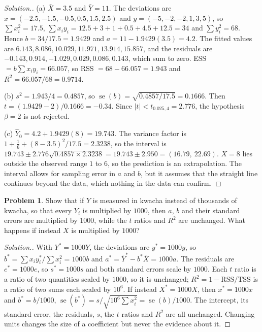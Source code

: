 \documentclass[11pt,a4paper]{article}
\numberwithin{equation}{section}
\theoremstyle{definition}
\newtheorem{problemx}{Problem}[subsection]
\newenvironment{problem}{\begin{problemx}}{\end{problemx}}
\newenvironment{solution}
  {\renewcommand{\qedsymbol}{}\begin{proof}[\textit{Solution}.]}
  {\end{proof}}
\begin{document}
\begin{solution}
(a) $\bar X = 3.5$ and $\bar Y = 11$. The deviations are $x = (-2.5, -1.5, -0.5, 0.5, 1.5, 2.5)$ and $y = (-5, -2, -2, 1, 3, 5)$, so
$\sum x_i^2 = 17.5$, $\sum x_iy_i = 12.5 + 3 + 1 + 0.5 + 4.5 + 12.5 = 34$ and $\sum y_i^2 = 68$. Hence $b = 34/17.5 = 1.9429$ and
$a = 11 - 1.9429(3.5) = 4.2$. The fitted values are $6.143, 8.086, 10.029, 11.971, 13.914, 15.857$, and the residuals are
$-0.143, 0.914, -1.029, 0.029, 0.086, 0.143$, which sum to zero. ESS $= b\sum x_iy_i = 66.057$, so RSS $= 68 - 66.057 = 1.943$ and
$R^2 = 66.057/68 = 0.9714$.

(b) $s^2 = 1.943/4 = 0.4857$, so $\operatorname{se}(b) = \sqrt{0.4857/17.5} = 0.1666$. Then $t = (1.9429 - 2)/0.1666 = -0.34$. Since
$|t| < t_{0.025,4} = 2.776$, the hypothesis $\beta = 2$ is not rejected.

(c) $\hat Y_0 = 4.2 + 1.9429(8) = 19.743$. The variance factor is $1 + \frac16 + (8 - 3.5)^2/17.5 = 2.3238$, so the interval is
$19.743 \pm 2.776\sqrt{0.4857 \times 2.3238} = 19.743 \pm 2.950 = (16.79,\ 22.69)$. $X = 8$ lies outside the observed range $1$ to $6$, so the
prediction is an extrapolation. The interval allows for sampling error in $a$ and $b$, but it assumes that the straight line continues beyond the
data, which nothing in the data can confirm.
\end{solution}

\begin{problem}
Show that if $Y$ is measured in kwacha instead of thousands of kwacha, so that every $Y_i$ is multiplied by $1000$, then $a$, $b$ and their
standard errors are multiplied by $1000$, while the $t$ ratios and $R^2$ are unchanged. What happens if instead $X$ is multiplied by $1000$?
\end{problem}

\begin{solution}
With $Y^* = 1000Y$, the deviations are $y^* = 1000y$, so $b^* = \sum x_iy_i^*/\sum x_i^2 = 1000b$ and $a^* = \bar Y^* - b^*\bar X = 1000a$. The
residuals are $e^* = 1000e$, so $s^* = 1000s$ and both standard errors scale by $1000$. Each $t$ ratio is a ratio of two quantities scaled by $1000$,
so it is unchanged; $R^2 = 1 - \text{RSS}/\text{TSS}$ is a ratio of two sums each scaled by $10^6$. If instead $X^* = 1000X$, then $x^* = 1000x$ and
$b^* = b/1000$, $\operatorname{se}(b^*) = s/\sqrt{10^6\sum x_i^2} = \operatorname{se}(b)/1000$. The intercept, its standard error, the residuals, $s$,
the $t$ ratios and $R^2$ are all unchanged. Changing units changes the size of a coefficient but never the evidence about it.
\end{solution}
\end{document}

